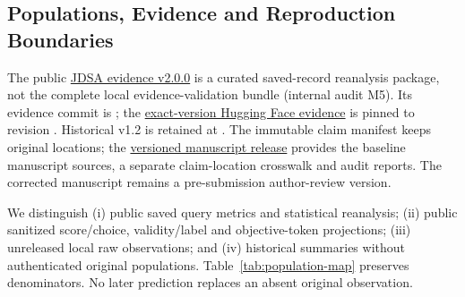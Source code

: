 \subsection{Populations, Evidence and Reproduction Boundaries}
\label{app:reproduction}
The public \href{https://github.com/SoroushVahidi/combinatorial-opt-agent/releases/tag/jdsa-evidence-v2.0.0}{JDSA evidence v2.0.0} is a curated saved-record reanalysis package, not the complete local evidence-validation bundle (internal audit M5). Its evidence commit is ; the \href{https://huggingface.co/datasets/SoroushVahidi/nl-optimization-instantiation-metrics/tree/f94012872211ab6a828147bb138fbe8ab695b982/releases/jdsa-evidence-v2.0.0}{exact-version Hugging Face evidence} is pinned to revision . Historical v1.2 is retained at . The immutable claim manifest keeps original locations; the \href{https://github.com/SoroushVahidi/combinatorial-opt-agent/releases/tag/jdsa-manuscript-v1.0.0}{versioned manuscript release} provides the baseline manuscript sources, a separate claim-location crosswalk and audit reports. The corrected manuscript remains a pre-submission author-review version.

We distinguish (i) public saved query metrics and statistical reanalysis; (ii) public sanitized score/choice, validity/label and objective-token projections; (iii) unreleased local raw observations; and (iv) historical summaries without authenticated original populations. Table~\ref{tab:population-map} preserves denominators. No later prediction replaces an absent original observation.


